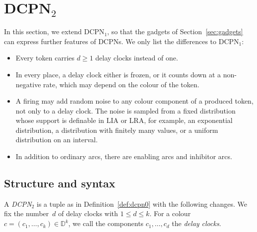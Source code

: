 \documentclass[11pt]{article}
\theoremstyle{definition}
\newcommand{\Dom}{\mathbb{D}}
\newcommand{\DCPN}[1]{\texorpdfstring{\textup{DCPN}\ensuremath{_{#1}}}{DCPN#1}}
\begin{document}
\section{\DCPN{2}}\label{sec:dcpn2}

In this section, we extend \DCPN{1}, so that the gadgets of
Section~\ref{sec:gadgets} can express further features of DCPNs. We only list
the differences to \DCPN{1}:

\begin{itemize}
  \item Every token carries $d \ge 1$ delay clocks instead of one.

  \item In every place, a delay clock either is frozen, or it counts down at
    a non-negative rate, which may depend on the colour of the token.

  \item A firing may add random noise to any colour component of a produced
    token, not only to a delay clock. The noise is sampled from a fixed
    distribution whose support is definable in LIA or LRA, for example, an
    exponential distribution, a distribution with finitely many values, or a
    uniform distribution on an interval.

  \item In addition to ordinary arcs, there are enabling arcs and inhibitor
    arcs.
\end{itemize}

\subsection{Structure and syntax}

A \emph{\DCPN{2}} is a tuple as in Definition~\ref{def:dcpn0} with the
following changes. We fix the number~$d$ of delay clocks with
$1 \le d \le k$. For a colour $c = (c_1, \dots, c_k) \in \Dom^k$, we call
the components $c_1, \dots, c_d$ the \emph{delay clocks}.
\end{document}
